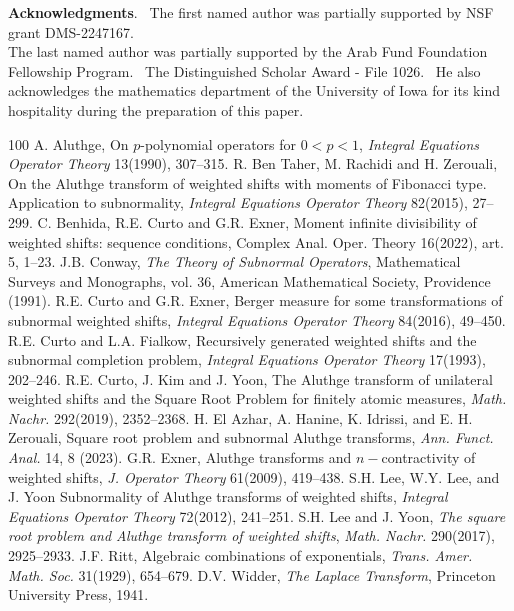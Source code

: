 \documentclass[12pt]{amsart}
\begin{document}
\bigskip
{\bf Acknowledgments}. \ The first named author was partially supported by NSF grant DMS-2247167. \\ The last named author was partially supported by the Arab Fund Foundation Fellowship Program.~
The Distinguished Scholar Award - File  1026. \ He also acknowledges the mathematics department of the University of Iowa for its kind hospitality during the preparation of this paper.

%
%


\begin{thebibliography}{100}
	  A. Aluthge, On $p$-polynomial operators for ${0<p<1}$, {\it Integral Equations Operator Theory} 13(1990), 307--315.
	 R. Ben Taher, M. Rachidi and H. Zerouali,  On the Aluthge transform of weighted shifts with moments of Fibonacci type. Application to subnormality, {\it Integral Equations Operator Theory} 82(2015), 27--299.
     C. Benhida, R.E. Curto and G.R. Exner, Moment infinite divisibility of weighted shifts: sequence conditions, Complex Anal. Oper. Theory 16(2022), art. 5, 1--23. 
     J.B. Conway, {\it The Theory of Subnormal Operators}, Mathematical Surveys and Monographs, vol. 36, American Mathematical Society, Providence (1991).
       R.E. Curto and G.R. Exner, Berger measure for some transformations of subnormal weighted shifts, {\it Integral Equations Operator Theory} 84(2016), 49--450.
     R.E. Curto and L.A. Fialkow, Recursively generated weighted shifts and the subnormal completion problem, {\it Integral Equations Operator Theory} 17(1993), 202--246. 
	 R.E. Curto, J. Kim and J. Yoon, The Aluthge transform of unilateral weighted shifts and the Square Root Problem for finitely atomic measures, {\it Math. Nachr.} 292(2019), 2352--2368.
     H. El Azhar, A. Hanine, K. Idrissi, and E. H. Zerouali, Square root problem and subnormal Aluthge transforms, {\it Ann. Funct. Anal.} 14, 8 (2023).
	 G.R. Exner, Aluthge transforms and $n-$contractivity of weighted shifts, {\it J. Operator Theory} 61(2009), 419--438.
     S.H. Lee, W.Y. Lee, and J. Yoon
	Subnormality of Aluthge transforms of weighted shifts, {\it Integral Equations Operator Theory} 72(2012), 241--251.
     S.H. Lee and J. Yoon, {\it The square root problem and Aluthge transform of weighted shifts}, {\it Math. Nachr.} 290(2017), 2925--2933.
     J.F. Ritt, Algebraic combinations of exponentials, {\it Trans. Amer. Math. Soc.} 31(1929), 654--679.
  D.V. Widder, {\it The Laplace Transform}, Princeton University Press, 1941.
\end{thebibliography}
\end{document}
